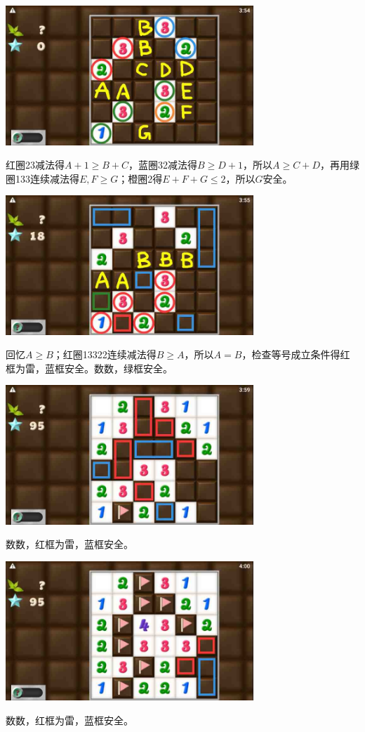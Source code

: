 \subsection{} %
\begin{center}
    \includegraphics[width=0.7\textwidth]{puzzlelow/243-1.jpg}
\end{center}
红圈23减法得$A+1\ge B+C$，蓝圈32减法得$B\ge D+1$，所以$A\ge C+D$，再用绿圈133连续减法得$E,F\ge G$；橙圈2得$E+F+G\le 2$，所以$G$安全。
\begin{center}
    \includegraphics[width=0.7\textwidth]{puzzlelow/243-2.jpg}
\end{center}
回忆$A\ge B$；红圈13322连续减法得$B\ge A$，所以$A=B$，检查等号成立条件得红框为雷，蓝框安全。数数，绿框安全。
\begin{center}
    \includegraphics[width=0.7\textwidth]{puzzlelow/243-3.jpg}
\end{center}
数数，红框为雷，蓝框安全。
\begin{center}
    \includegraphics[width=0.7\textwidth]{puzzlelow/243-4.jpg}
\end{center}
数数，红框为雷，蓝框安全。

